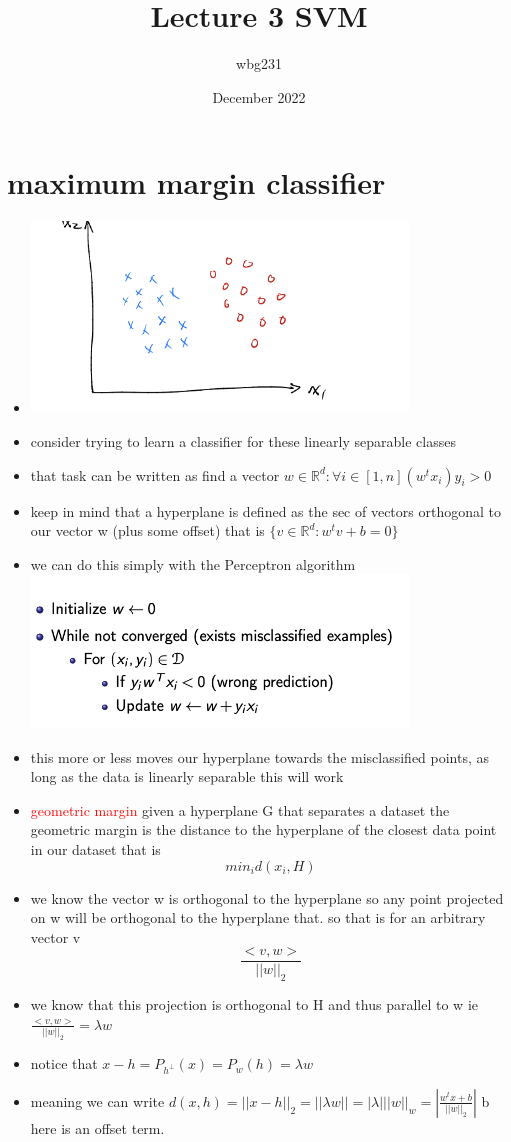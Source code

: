 \documentclass{article}
\title{Lecture 3 SVM}
\author{wbg231 }
\date{December 2022}
\begin{document}
\maketitle

\section{maximum margin classifier}
\begin{itemize}
\item \includegraphics*[width=10cm]{images/Screenshot 2023-05-12 at 12.17.08 PM.png}
\item consider trying to learn a classifier for these linearly separable classes
\item that task can be written as find a vector $w\in \mathbb{R}^{d}:\forall i\in [1,n] (w^tx_i)y_i>0 $
\item keep in mind that a hyperplane is defined as the sec of vectors orthogonal to our vector w (plus some offset) that is $\{v\in \mathbb{R}^d: w^tv+b=0\}$
\item we can do this simply with the Perceptron algorithm \\ \includegraphics*[width=10cm]{images/Screenshot 2023-05-12 at 12.21.31 PM.png}
\item this more or less moves our hyperplane towards the misclassified points, as long as the data is linearly separable this will work 
\item  \textcolor{red}{geometric margin} given a hyperplane G that separates a dataset the geometric margin is the distance to the hyperplane of the closest data point in our dataset that is $$min_{i}d(x_i,H)$$
\item we know the vector w is orthogonal to the hyperplane so any point projected on w will be orthogonal to the  hyperplane that. so that is for an arbitrary vector v $$\frac{<v,w>}{||w||_{2}}$$
\item we know that this projection is orthogonal to H and thus parallel to w  ie $\frac{<v,w>}{||w||_{2}}=\lambda w$
\item notice that $x-h=P_{h^{\perp}}(x)=P_{w}(h)=\lambda w$ 
\item meaning we can write $d(x,h)=||x-h||_{2}=||\lambda w||=|\lambda| ||w||_{w}= |\frac{w^tx+b}{||w||_2}|$ b here is an offset term. 

\end{itemize}
\end{document}
